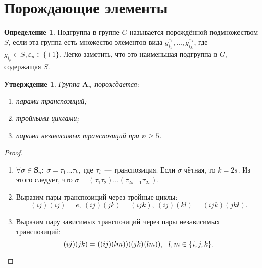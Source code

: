 \documentclass[a4paper, 14pt]{extarticle}
\newcommand{\symmetrical}{\mathbf{S}}
\newcommand{\alternating}{\mathbf{A}}
\newcommand{\suchthat}{{:}{ } \ }
\renewcommand{\epsilon}{\varepsilon} %
\theoremstyle{definition}
\newtheorem{definition}{Определение}
\theoremstyle{plain}
\numberwithin{theorem}{section}
\numberwithin{definition}{section}
\newtheorem{statement}{Утверждение}
\numberwithin{statement}{section}
\numberwithin{lemma}{section}
\numberwithin{consequence}{section}
\begin{document}
        \section{Порождающие элементы}
        \setcounter{definition}{0}
        \begin{definition}
            Подгруппа в группе $G$ называется порождённой подмножеством $S$, если эта группа
            есть множество элементов вида ${g_{i_1}^{\epsilon_1},\ldots,g_{i_k}^{\epsilon_k}}$, где ${g_{i_p} \in S, \epsilon_p \in \{\pm1\}.}$ Легко заметить, что это наименьшая подгруппа в $G$, содержащая $S$.
        \end{definition}
        \begin{statement}
            Группа $\alternating_n$ порождается:
            \
            \begin{enumerate}
            \setlength\itemsep{0.1em}
                \item парами транспозиций; 
                \item тройными циклами;
                \item парами независимых транспозиций при $n \geqslant 5$.
            \end{enumerate}
        \end{statement}
        \begin{proof}
            \
            \begin{enumerate}
            \setlength\itemsep{0.1em}
                \item ${\forall \sigma \in \symmetrical_n\suchthat \sigma = \tau_1 \ldots \tau_k,}$ где $\tau_i$~--- транспозиция. Если $\sigma$ чётная, то ${k = 2s.}$ Из этого следует, что ${\sigma = (\tau_1 \tau_2)\ldots(\tau_{2s-1}\tau_{2s}).}$
                \item Выразим пары транспозиций через тройные циклы:
                \begin{equation*}
                    (ij)(ij) = e, \ (ij)(jk) = (ijk), \ (ij)(kl) = (ijk)(jkl).
                \end{equation*}
                \item Выразим пару зависимых транспозиций через пары независимых транспозиций:
                \begin{equation*}
                    (ij)(jk) = ((ij)(lm))((jk)(lm)), \ \ l,m \in \{i, j, k\}. \qedhere
                \end{equation*}
            \end{enumerate}
        \end{proof}
\end{document}
